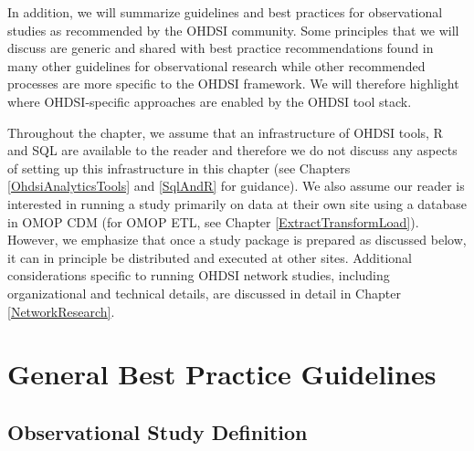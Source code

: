 \documentclass[11pt]{book}
\theoremstyle{definition}
\theoremstyle{definition}
\theoremstyle{definition}
\theoremstyle{remark}
\begin{document}
In addition, we will summarize guidelines and best practices for
observational studies as recommended by the OHDSI community. Some
principles that we will discuss are generic and shared with best
practice recommendations found in many other guidelines for
observational research while other recommended processes are more
specific to the OHDSI framework. We will therefore highlight where
OHDSI-specific approaches are enabled by the OHDSI tool stack.

Throughout the chapter, we assume that an infrastructure of OHDSI tools,
R and SQL are available to the reader and therefore we do not discuss
any aspects of setting up this infrastructure in this chapter (see
Chapters \ref{OhdsiAnalyticsTools} and \ref{SqlAndR} for guidance). We
also assume our reader is interested in running a study primarily on
data at their own site using a database in OMOP CDM (for OMOP ETL, see
Chapter \ref{ExtractTransformLoad}). However, we emphasize that once a
study package is prepared as discussed below, it can in principle be
distributed and executed at other sites. Additional considerations
specific to running OHDSI network studies, including organizational and
technical details, are discussed in detail in Chapter
\ref{NetworkResearch}.

\section{General Best Practice
Guidelines}\label{general-best-practice-guidelines}

\subsection{Observational Study
Definition}\label{observational-study-definition}
\end{document}
